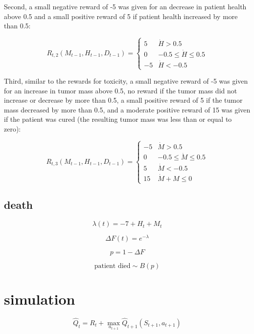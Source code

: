 \documentclass[12pt]{article}
\begin{document}
Second, a small negative reward of -5 was given for an decrease in patient health above 0.5 and a small positive reward of 5 if patient health increased by more than 0.5:

\[
R_{t, 2}(M_{t-1}, H_{t-1}, D_{t-1}) =  
\begin{cases}
  5 & \dot{H} > 0.5 \\
  0 & -0.5 \leq \dot{H} \leq 0.5 \\
  -5 & \dot{H} < -0.5
\end{cases}
\]

Third, similar to the rewards for toxicity, a small negative reward of -5 was given for an increase in tumor mass above 0.5, no reward if the tumor mass did not increase or decrease by more than 0.5, a small positive reward of 5 if the tumor mass decreased by more than 0.5, and a moderate positive reward of 15 was given if the patient was cured (the resulting tumor mass was less than or equal to zero):

\[
R_{t, 3}(M_{t-1}, H_{t-1}, D_{t-1}) = 
\begin{cases}
  -5 & \dot{M} > 0.5 \\
  0 & -0.5 \leq \dot{M} \leq 0.5 \\
  5 & \dot{M} < -0.5 \\
  15 & \dot{M} + M \leq 0
\end{cases}
\]


\subsection{death} %
\label{sub:death}

\[
\lambda(t) = -7 + H_{t} + M_{t}
\]

\[
\Delta F(t) = e^{-\lambda}
\]

\[
p = 1 - \Delta F
\]

\[
\text{patient died} \sim B(p)
\]




\section{simulation} %
\label{sec:simulation}

\[
\hat{Q}_{t} = R_{t} + \max_{a_{t + 1}} \hat{Q}_{t+1}(S_{t+1}, a_{t+1})
\]



\end{document}
